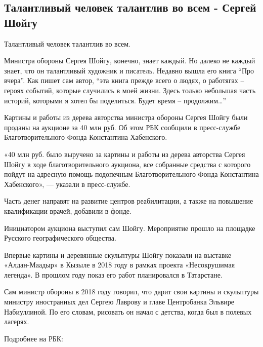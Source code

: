  
 
 
 
 
\subsection{Талантливый человек талантлив во всем - Сергей Шойгу}

Талантливый человек талантлив во всем. 

Министра обороны Сергея Шойгу, конечно, знает каждый. Но далеко не каждый
знает, что он талантливый художник и писатель. Недавно вышла его книга \enquote{Про вчера}. Как пишет сам автор, 
\enquote{эта книга прежде всего о людях, о работягах –
героях событий, которые случились в моей жизни. Здесь только небольшая часть
историй, которыми я хотел бы поделиться. Будет время – продолжим…} 

Картины и работы из дерева авторства министра обороны Сергея Шойгу были проданы
на аукционе за 40 млн руб. Об этом РБК сообщили в пресс-службе
Благотворительного Фонда Константина Хабенского.

«40 млн руб. было выручено за картины и работы из дерева авторства Сергея Шойгу
в ходе благотворительного аукциона, все собранные средства с которого пойдут на
адресную помощь подопечным Благотворительного Фонда Константина Хабенского», —
указали в пресс-службе.

Часть денег направят на развитие центров реабилитации, а также на повышение квалификации врачей, добавили в фонде.

Инициатором аукциона выступил сам Шойгу. Мероприятие прошло на площадке Русского географического общества.

Впервые картины и деревянные скульптуры Шойгу показали на выставке
«Алдан-Маадыр» в Кызыле в 2018 году в рамках проекта «Несокрушимая легенда». В
прошлом году показ его работ планировался в Татарстане.

Сам министр обороны в 2018 году говорил, что дарит свои картины и скульптуры
министру иностранных дел Сергею Лаврову и главе Центробанка Эльвире
Набиуллиной. По его словам, рисовать он начал с детства, когда был в полевых
лагерях.

Подробнее на РБК:

